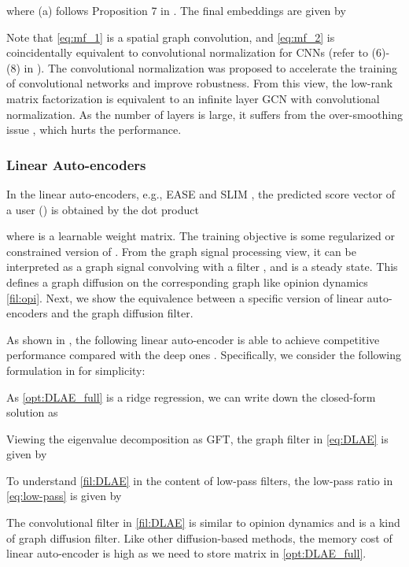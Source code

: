 \documentclass[sigconf]{acmart}
\begin{document}
where (a) follows Proposition 7 in \cite{journee2010generalized}. The final embeddings are given by 

Note that \eqref{eq:mf_1} is a spatial graph convolution, and \eqref{eq:mf_2} is coincidentally equivalent to convolutional normalization for CNNs \cite{liu2021convolutional} (refer to (6)-(8) in \cite{liu2021convolutional}). The convolutional normalization was proposed to accelerate the training of convolutional networks and improve robustness. From this view, the low-rank matrix factorization is equivalent to an infinite layer GCN with convolutional normalization. As the number of layers is large, it suffers from the over-smoothing issue \cite{li2018deeper}, which hurts the performance.

\subsubsection{Linear Auto-encoders} In the linear auto-encoders, e.g., EASE \cite{steck2019embarrassingly} and SLIM \cite{ning2011slim}, the predicted score vector of a user () is obtained by the dot product

where  is a learnable weight matrix. The training objective is some regularized or constrained version of  . From the graph signal processing view, it can be interpreted as a graph signal  convolving with a filter , and  is a steady state. This defines a graph diffusion on the corresponding graph like opinion dynamics \eqref{fil:opi}. Next, we show the equivalence between a specific version of linear auto-encoders and the graph diffusion filter.

As shown in \cite{steck2020autoencoders}, the following linear auto-encoder is able to achieve competitive performance compared with the deep ones \cite{wu2016collaborative,liang2018variational}. Specifically, we consider the following formulation in \cite{steck2020autoencoders} for simplicity:

As \eqref{opt:DLAE_full} is a ridge regression, we can write down the closed-form solution as 

Viewing the eigenvalue decomposition as GFT, the graph filter in \eqref{eq:DLAE} is given by

To understand \eqref{fil:DLAE} in the content of low-pass filters, the low-pass ratio  in \eqref{eq:low-pass} is given by

The convolutional filter in \eqref{fil:DLAE} is similar to opinion dynamics and is a kind of graph diffusion filter. Like other diffusion-based methods, the memory cost of linear auto-encoder is high as we need to store matrix  in \eqref{opt:DLAE_full}.
\end{document}
